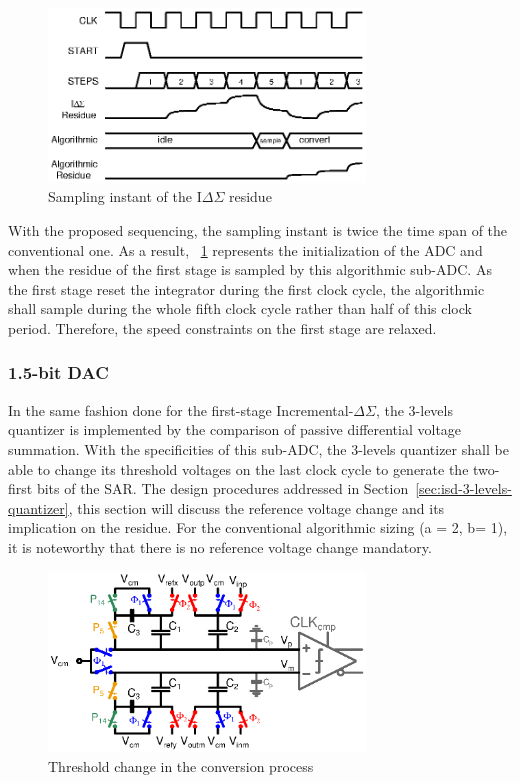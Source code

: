 \begin{figure}[htp]
	\centering
	\includegraphics[width=0.75\textwidth]{Chapter4/Figs/isd-algo-residue-sampling.ps}
	\caption{Sampling instant of the I\(\Delta \Sigma \) residue}
	\label{fig:digital-sampling}
\end{figure}

With the proposed sequencing, the sampling instant is twice the time span of the conventional one. As a result, \figurename~\ref{fig:digital-sampling} represents the initialization of the ADC and when the residue of the first stage is sampled by this algorithmic sub-ADC\@. As the first stage reset the integrator during the first clock cycle, the algorithmic shall sample during the whole fifth clock cycle rather than half of this clock period. Therefore, the speed constraints on the first stage are relaxed.

	\subsubsection{1.5-bit DAC}             %
In the same fashion done for the first-stage Incremental-\(\Delta\Sigma \), the 3-levels quantizer is implemented by the comparison of passive differential voltage summation. With the specificities of this sub-ADC, the 3-levels quantizer shall be able to change its threshold voltages on the last clock cycle to generate the two-first bits of the SAR\@. The design procedures addressed in Section~\ref{sec:isd-3-levels-quantizer}, this section will discuss the reference voltage change and its implication on the residue. For the conventional algorithmic sizing (a = 2, b= 1), it is noteworthy that there is no reference voltage change mandatory.

\begin{figure}[htp]
	\centering
	\includegraphics[width=0.75\textwidth]{Chapter4/Figs/algo-passive-adder-comp.ps}
	\caption{Threshold change in the conversion process}
	\label{fig:thresholds-generator}
\end{figure}

